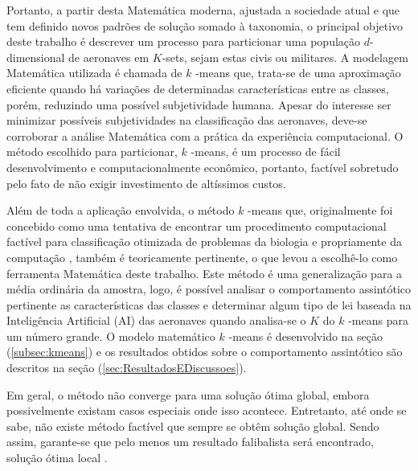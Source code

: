 \documentclass[12pt]{article}
\begin{document}
			Portanto, a partir desta Matemática moderna, ajustada a sociedade atual e que tem definido novos padrões de solução somado à taxonomia, o principal objetivo deste trabalho é descrever um processo para particionar uma população $ d $-dimensional de aeronaves em $ K $-sets, sejam estas civis ou militares. A modelagem Matemática utilizada é chamada de $ k $ -means que, trata-se de uma aproximação eficiente quando há variações de determinadas características entre as classes, porém, reduzindo uma possível subjetividade humana. Apesar do interesse ser minimizar possíveis subjetividades na classificação das aeronaves, deve-se corroborar a análise Matemática com a prática da experiência computacional. O método escolhido para particionar, $ k $ -means, é um processo de fácil desenvolvimento e computacionalmente econômico, portanto, factível sobretudo pelo fato de não exigir investimento de altíssimos custos. 
			
			Além de toda a aplicação envolvida, o método $ k $ -means que, originalmente foi concebido como uma tentativa de encontrar um procedimento computacional factível para classificação otimizada de problemas da biologia e propriamente da computação \cite{MacQueen1967}, também é teoricamente pertinente, o que levou a escolhê-lo como ferramenta Matemática deste trabalho. Este método é uma generalização para a média ordinária da amostra, logo, é possível analisar o comportamento assintótico pertinente as características das classes e determinar algum tipo de lei baseada na Inteligência Artificial (AI) das aeronaves quando analisa-se o $ K $ do $ k $ -means para um número grande. O modelo matemático $ k $ -means é desenvolvido na seção (\ref{subsec:kmeans}) e os resultados obtidos sobre o comportamento assintótico são descritos na seção (\ref{sec:ResultadosEDiscussoes}).
			
			Em geral, o método não converge para uma solução ótima global, embora possivelmente existam casos especiais onde isso acontece. Entretanto, até onde se sabe, não existe método factível que sempre se obtêm solução global. Sendo assim, garante-se que pelo menos um resultado falibalista será encontrado, solução ótima local \cite{MacQueen1967}.
	
\end{document}
